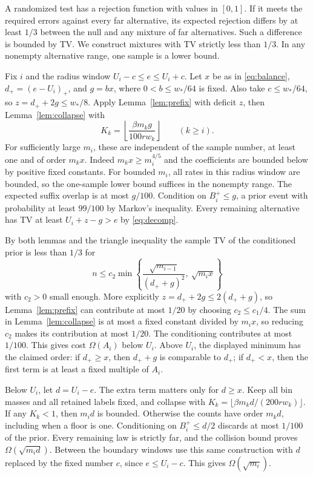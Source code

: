 \documentclass[11pt]{article}
\begin{document}
A randomized test has a rejection function with values in \([0,1]\). If it meets the required errors against every far alternative, its expected rejection differs by at least \(1/3\) between the null and any mixture of far alternatives. Such a difference is bounded by TV. We construct mixtures with TV strictly less than \(1/3\). In any nonempty alternative range, one sample is a lower bound.

Fix \(i\) and the radius window \(U_i-c\le e\le U_i+c\). Let \(x\) be as in \eqref{eq:balance}, \(d_+=(e-U_i)_+\), and \(g=b x\), where \(0<b\le w_*/64\) is fixed. Also take \(c\le w_*/64\), so \(z=d_++2g\le w_*/8\). Apply Lemma~\ref{lem:prefix} with deficit \(z\), then Lemma~\ref{lem:collapse} with
\[
 K_k=\left\lfloor\frac{\beta m_k g}{100 r w_k}\right\rfloor\qquad(k\ge i).
\]
For sufficiently large \(m_i\), these are independent of the sample number, at least one and of order \(m_k x\). Indeed \(m_k x\ge m_i^{4/5}\) and the coefficients are bounded below by positive fixed constants. For bounded \(m_i\), all rates in this radius window are bounded, so the one-sample lower bound suffices in the nonempty range. The expected suffix overlap is at most \(g/100\). Condition on \(B_i^+\le g\), a prior event with probability at least \(99/100\) by Markov's inequality. Every remaining alternative has TV at least \(U_i+z-g>e\) by \eqref{eq:decomp}.

By both lemmas and the triangle inequality the sample TV of the conditioned prior is less than \(1/3\) for
\[
 n\le c_2\min\left\{\frac{\sqrt{m_{i-1}}}{(d_++g)^2},\ \sqrt{m_i x}\right\}
\]
with \(c_2>0\) small enough. More explicitly \(z=d_++2g\le2(d_++g)\), so Lemma~\ref{lem:prefix} can contribute at most \(1/20\) by choosing \(c_2\le c_1/4\). The sum in Lemma~\ref{lem:collapse} is at most a fixed constant divided by \(m_i x\), so reducing \(c_2\) makes its contribution at most \(1/20\). The conditioning contributes at most \(1/100\). This gives cost \(\Omega(A_i)\) below \(U_i\). Above \(U_i\), the displayed minimum has the claimed order: if \(d_+\ge x\), then \(d_++g\) is comparable to \(d_+\); if \(d_+<x\), then the first term is at least a fixed multiple of \(A_i\).

Below \(U_i\), let \(d=U_i-e\). The extra term matters only for \(d\ge x\). Keep all bin masses and all retained labels fixed, and collapse with \(K_k=\lfloor\beta m_k d/(200r w_k)\rfloor\). If any \(K_k<1\), then \(m_i d\) is bounded. Otherwise the counts have order \(m_k d\), including when a floor is one. Conditioning on \(B_i^+\le d/2\) discards at most \(1/100\) of the prior. Every remaining law is strictly far, and the collision bound proves \(\Omega(\sqrt{m_i d})\). Between the boundary windows use this same construction with \(d\) replaced by the fixed number \(c\), since \(e\le U_i-c\). This gives \(\Omega(\sqrt{m_i})\).
\end{document}

